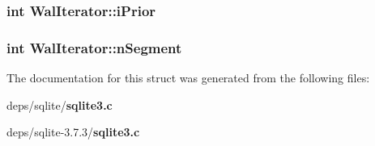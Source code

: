 \subsubsection{\setlength{\rightskip}{0pt plus 5cm}int \bf{Wal\-Iterator::i\-Prior}}\label{structWalIterator_15582fdb20f099a072f89849a0789a63}


\subsubsection{\setlength{\rightskip}{0pt plus 5cm}int \bf{Wal\-Iterator::n\-Segment}}\label{structWalIterator_300a1213c93f76431d643a31cbf5bcba}




The documentation for this struct was generated from the following files:\begin{CompactItemize}
\item 
deps/sqlite/\bf{sqlite3.c}\item 
deps/sqlite-3.7.3/\bf{sqlite3.c}\end{CompactItemize}
